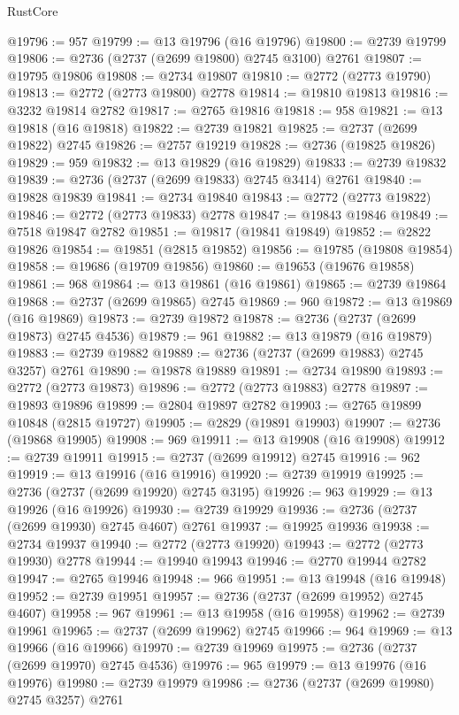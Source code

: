 \begin{lexlean}{RustCore}
\begin{coremodule}
@19796 := 957
@19799 := @13 @19796 (@16 @19796)
@19800 := @2739 @19799
@19806 := @2736 (@2737 (@2699 @19800) @2745 @3100) @2761
@19807 := @19795 @19806
@19808 := @2734 @19807
@19810 := @2772 (@2773 @19790)
@19813 := @2772 (@2773 @19800) @2778
@19814 := @19810 @19813
@19816 := @3232 @19814 @2782
@19817 := @2765 @19816
@19818 := 958
@19821 := @13 @19818 (@16 @19818)
@19822 := @2739 @19821
@19825 := @2737 (@2699 @19822) @2745
@19826 := @2757 @19219
@19828 := @2736 (@19825 @19826)
@19829 := 959
@19832 := @13 @19829 (@16 @19829)
@19833 := @2739 @19832
@19839 := @2736 (@2737 (@2699 @19833) @2745 @3414) @2761
@19840 := @19828 @19839
@19841 := @2734 @19840
@19843 := @2772 (@2773 @19822)
@19846 := @2772 (@2773 @19833) @2778
@19847 := @19843 @19846
@19849 := @7518 @19847 @2782
@19851 := @19817 (@19841 @19849)
@19852 := @2822 @19826
@19854 := @19851 (@2815 @19852)
@19856 := @19785 (@19808 @19854)
@19858 := @19686 (@19709 @19856)
@19860 := @19653 (@19676 @19858)
@19861 := 968
@19864 := @13 @19861 (@16 @19861)
@19865 := @2739 @19864
@19868 := @2737 (@2699 @19865) @2745
@19869 := 960
@19872 := @13 @19869 (@16 @19869)
@19873 := @2739 @19872
@19878 := @2736 (@2737 (@2699 @19873) @2745 @4536)
@19879 := 961
@19882 := @13 @19879 (@16 @19879)
@19883 := @2739 @19882
@19889 := @2736 (@2737 (@2699 @19883) @2745 @3257) @2761
@19890 := @19878 @19889
@19891 := @2734 @19890
@19893 := @2772 (@2773 @19873)
@19896 := @2772 (@2773 @19883) @2778
@19897 := @19893 @19896
@19899 := @2804 @19897 @2782
@19903 := @2765 @19899 @10848 (@2815 @19727)
@19905 := @2829 (@19891 @19903)
@19907 := @2736 (@19868 @19905)
@19908 := 969
@19911 := @13 @19908 (@16 @19908)
@19912 := @2739 @19911
@19915 := @2737 (@2699 @19912) @2745
@19916 := 962
@19919 := @13 @19916 (@16 @19916)
@19920 := @2739 @19919
@19925 := @2736 (@2737 (@2699 @19920) @2745 @3195)
@19926 := 963
@19929 := @13 @19926 (@16 @19926)
@19930 := @2739 @19929
@19936 := @2736 (@2737 (@2699 @19930) @2745 @4607) @2761
@19937 := @19925 @19936
@19938 := @2734 @19937
@19940 := @2772 (@2773 @19920)
@19943 := @2772 (@2773 @19930) @2778
@19944 := @19940 @19943
@19946 := @2770 @19944 @2782
@19947 := @2765 @19946
@19948 := 966
@19951 := @13 @19948 (@16 @19948)
@19952 := @2739 @19951
@19957 := @2736 (@2737 (@2699 @19952) @2745 @4607)
@19958 := 967
@19961 := @13 @19958 (@16 @19958)
@19962 := @2739 @19961
@19965 := @2737 (@2699 @19962) @2745
@19966 := 964
@19969 := @13 @19966 (@16 @19966)
@19970 := @2739 @19969
@19975 := @2736 (@2737 (@2699 @19970) @2745 @4536)
@19976 := 965
@19979 := @13 @19976 (@16 @19976)
@19980 := @2739 @19979
@19986 := @2736 (@2737 (@2699 @19980) @2745 @3257) @2761

\end{coremodule}
\end{lexlean}
